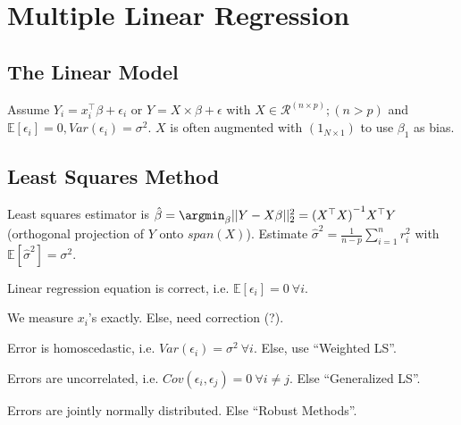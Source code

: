 \section{Multiple Linear Regression}\label{sec:multiple_linear_regression}
\subsection{The Linear Model}\label{subsec:the_linear_model}
\begin{sectionbox}\nospacing{}
Assume $Y_i = x_{i}^{\top}\beta + \epsilon_{i}$ or $Y = X \times \beta + \epsilon$ with $X \in \mathcal{R}^{(n \times p)}; (n > p)$ and $\mathbb{E}[\epsilon_{i}]=0, Var(\epsilon_{i}) = \sigma^{2}$.
$X$ is often augmented with $(1_{N\times 1})$ to use $\beta_{1}$ as bias.
\end{sectionbox}
\subsection{Least Squares Method}\label{subsec:least_squares_method}
\begin{sectionbox}\nospacing{}
  Least squares estimator is $\hat \beta = \argmin_{\beta} ||Y - X\beta||^{2}_{2} = {(X^{\top}X)}^{-1} X^{\top}Y$ (orthogonal projection of $Y$ onto $span(X)$).
  Estimate $\hat{\sigma}^{2} = \frac{1}{n-p}\sum_{i=1}^{n}r_{i}^{2}$ with $\mathbb{E}[\hat{\sigma}^{2}] = \sigma^{2}$.
\end{sectionbox}

\begin{notebox}\nospacing{}
    \begin{enumeratenosep}[label=\roman*]
        \item Linear regression equation is correct, i.e. $\mathbb{E}[\epsilon_{i}]=0\ \forall i$.
        \item We measure $x_{i}$'s exactly. Else, need correction (?).
        \item Error is homoscedastic, i.e. $Var(\epsilon_{i})=\sigma^{2}\ \forall i$. Else, use ``Weighted LS''.
        \item Errors are uncorrelated, i.e. $Cov(\epsilon_{i}, \epsilon_{j}) = 0\ \forall i \neq j$. Else ``Generalized LS''.
        \item Errors are jointly normally distributed. Else ``Robust Methods''.
    \end{enumeratenosep}
\end{notebox}

